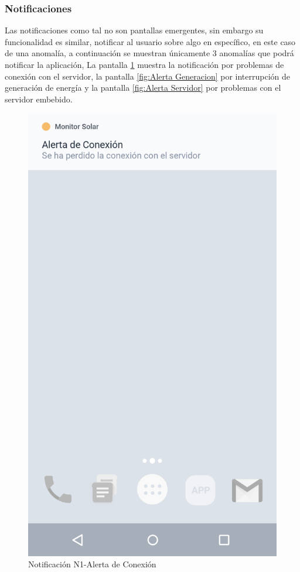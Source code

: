 \subsubsection{Notificaciones}\label{Notificaciones}

Las notificaciones como tal no son pantallas emergentes, sin embargo su funcionalidad es similar, notificar al usuario sobre algo en específico, en este caso de una anomalía, a continuación se muestran únicamente 3 anomalías que podrá notificar la aplicación, La pantalla \ref{fig:Alerta Conexion} muestra la notificación por problemas de conexión con el servidor, la pantalla \ref{fig:Alerta Generacion} por interrupción de generación de energía y la pantalla \ref{fig:Alerta Servidor} por problemas con el servidor embebido. 

\begin{figure}[H]
	\centering
	\includegraphics[scale=0.70]{Capitulo4/software/submodulos/images/notif_con.png}
	\caption{Notificación N1-Alerta de Conexión}
	\label{fig:Alerta Conexion}
\end{figure}


